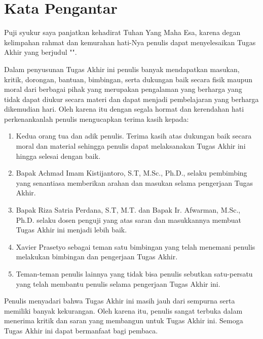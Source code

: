 \chapter*{Kata Pengantar}

Puji syukur saya panjatkan kehadirat Tuhan Yang Maha Esa, karena degan kelimpahan rahmat dan kemurahan hati-Nya penulis dapat menyelesaikan Tugas Akhir yang berjudul "\thetitle".

Dalam penyusunan Tugas Akhir ini penulis banyak mendapatkan masukan, kritik, dorongan, bantuan, bimbingan, serta dukungan baik secara fisik maupun moral dari berbagai pihak yang merupakan pengalaman yang berharga yang tidak dapat diukur secara materi dan dapat menjadi pembelajaran yang berharga dikemudian hari. Oleh karena itu dengan segala hormat dan kerendahan hati perkenankanlah penulis mengucapkan terima kasih kepada:

\begin{enumerate}
	\item Kedua orang tua dan adik penulis. Terima kasih atas dukungan baik secara moral dan material sehingga penulis dapat melaksanakan Tugas Akhir ini hingga selesai dengan baik.
	\item Bapak Achmad Imam Kistijantoro, S.T, M.Sc., Ph.D., selaku pembimbing yang senantiasa memberikan arahan dan masukan selama pengerjaan Tugas Akhir.
	\item Bapak Riza Satria Perdana, S.T, M.T. dan Bapak Ir. Afwarman, M.Sc., Ph.D. selaku dosen penguji yang atas saran dan masukkannya membuat Tugas Akhir ini menjadi lebih baik.
	\item Xavier Prasetyo sebagai teman satu bimbingan yang telah menemani penulis melakukan bimbingan dan pengerjaan Tugas Akhir. 
	\item Teman-teman penulis lainnya yang tidak bisa penulis sebutkan satu-persatu yang telah membantu penulis selama pengerjaan Tugas Akhir ini.
\end{enumerate}

Penulis menyadari bahwa Tugas Akhir ini masih jauh dari sempurna serta memiliki banyak kekurangan. Oleh karena itu, penulis sangat terbuka dalam menerima kritik dan saran yang membangun untuk Tugas Akhir ini. Semoga Tugas Akhir ini dapat bermanfaat bagi pembaca.

